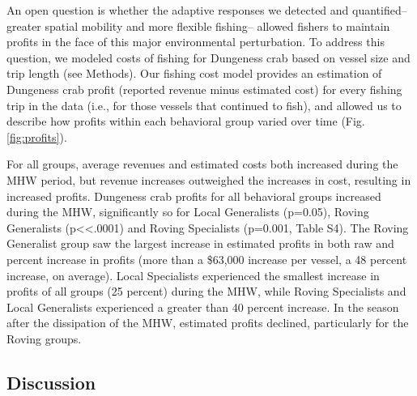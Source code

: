 \documentclass[9pt,twocolumn,twoside,lineno]{pnas-new}
\begin{document}
An open question is whether the adaptive responses we detected and
quantified-- greater spatial mobility and more flexible fishing--
allowed fishers to maintain profits in the face of this major
environmental perturbation. To address this question, we modeled costs
of fishing for Dungeness crab based on vessel size and trip length (see
Methods). Our fishing cost model provides an estimation of Dungeness
crab profit (reported revenue minus estimated cost) for every fishing
trip in the data (i.e., for those vessels that continued to fish), and
allowed us to describe how profits within each behavioral group varied
over time (Fig. \ref{fig:profits}).

For all groups, average revenues and estimated costs both increased
during the MHW period, but revenue increases outweighed the increases in
cost, resulting in increased profits. Dungeness crab profits for all
behavioral groups increased during the MHW, significantly so for Local
Generalists (p=0.05), Roving Generalists (p\textless\textless.0001) and
Roving Specialists (p=0.001, Table S4). The Roving Generalist group saw
the largest increase in estimated profits in both raw and percent
increase in profits (more than a \$63,000 increase per vessel, a 48
percent increase, on average). Local Specialists experienced the
smallest increase in profits of all groups (25 percent) during the MHW,
while Roving Specialists and Local Generalists experienced a greater
than 40 percent increase. In the season after the dissipation of the
MHW, estimated profits declined, particularly for the Roving groups.

\hypertarget{discussion}{%
\subsection*{Discussion}\label{discussion}}
\end{document}
